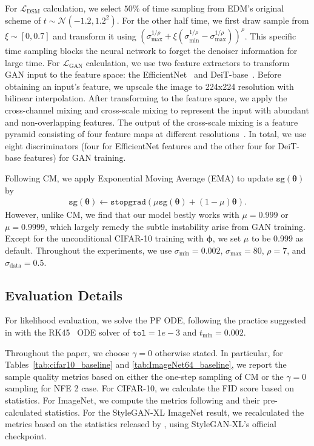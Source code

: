 \documentclass{article} \usepackage{iclr2024_coNFErence,times}
\theoremstyle{definition}
\theoremstyle{remark}
\begin{document}
For $\mathcal{L}_{\text{DSM}}$ calculation, we select $50\%$ of time sampling from EDM's original scheme of $t\sim\mathcal{N}(-1.2, 1.2^{2})$. For the other half time, we first draw sample from $\xi\sim[0,0.7]$ and transform it using $(\sigma_{\text{max}}^{1/\rho}+\xi(\sigma_{\text{min}}^{1/\rho}-\sigma_{\text{max}}^{1/\rho}))^{\rho}$. This specific time sampling blocks the neural network to forget the denoiser information for large time. For $\mathcal{L}_{\text{GAN}}$ calculation, we use two feature extractors to transform GAN input to the feature space: the EfficientNet~\citep{tan2019efficientnet} and DeiT-base~\citep{touvron2021training}. Before obtaining an input's feature, we upscale the image to 224x224 resolution with bilinear interpolation. After transforming to the feature space, we apply the cross-channel mixing and cross-scale mixing to represent the input with abundant and non-overlapping features. The output of the cross-scale mixing is a feature pyramid consisting of four feature maps at different resolutions~\citep{sauer2022stylegan}. In total, we use eight discriminators (four for EfficientNet features and the other four for DeiT-base features) for GAN training.

Following CM, we apply Exponential Moving Average (EMA) to update $\texttt{sg}(\bm{\theta})$ by
\begin{align*}
    \texttt{sg}(\bm{\theta})\leftarrow \texttt{stopgrad}(\mu\texttt{sg}(\bm{\theta})+(1-\mu)\bm{\theta}).
\end{align*}
However, unlike CM, we find that our model bestly works with $\mu=0.999$ or $\mu=0.9999$, which largely remedy the subtle instability arise from GAN training. Except for the unconditional CIFAR-10 training with $\bm{\phi}$, we set $\mu$ to be 0.999 as default. Throughout the experiments, we use $\sigma_{\text{min}}=0.002$, $\sigma_{\text{max}}=80$, $\rho=7$, and $\sigma_{\text{data}}=0.5$.

\subsection{Evaluation Details}\label{appendix:sampling_details}

For likelihood evaluation, we solve the PF ODE, following the practice suggested in \citet{kim2022maximum} with the RK45~\citep{dormand1980family} ODE solver of $\texttt{tol}=1e-3$ and $t_{\text{min}}=0.002$. 

Throughout the paper, we choose $\gamma=0$ otherwise stated. In particular, for Tables~\ref{tab:cifar10_baseline} and \ref{tab:ImageNet64_baseline}, we report the sample quality metrics based on either the one-step sampling of CM or the $\gamma=0$ sampling for NFE 2 case. For CIFAR-10, we calculate the FID score based on \citet{karras2022elucidating} statistics. For ImageNet, we compute the metrics following \citet{dhariwal2021diffusion} and their pre-calculated statistics. For the StyleGAN-XL ImageNet result, we recalculated the metrics based on the statistics released by \citet{dhariwal2021diffusion}, using StyleGAN-XL's official checkpoint.
\end{document}
